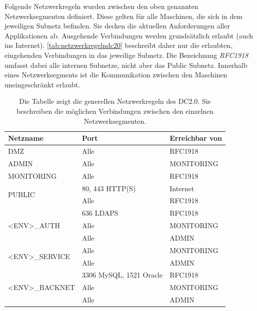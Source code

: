 Folgende Netzwerkregeln wurden zwischen den oben genannten Netzwerksegmenten definiert. Diese gelten für alle Maschinen, die sich in dem jeweiligen Subnetz befinden. Sie decken die aktuellen Anforderungen aller Applikationen ab. Ausgehende Verbindungen werden grundsätzlich erlaubt (auch ins Internet). \autoref{tab:netzwerkregelndc20} beschreibt daher nur die erlaubten, eingehenden Verbindungen in das jeweilige Subnetz. Die Bezeichnung \textit{RFC1918} umfasst dabei alle internen Subnetze, nicht aber das Public Subnetz. Innerhalb eines Netzwerksegments ist die Kommunikation zwischen den Maschinen uneingeschränkt erlaubt.

\begin{table}[ht]
\setlength{\tabcolsep}{5pt}
\renewcommand{\arraystretch}{1.5}
\centering
\begin{tabular}{|l|l|l|}
\hline
\rowcolor[HTML]{C0C0C0}
\textbf{Netzname} 				& \textbf{Port} 		& \textbf{Erreichbar von}	\\ 
\hline
DMZ 								& Alle				& RFC1918		\\ 
\hline 
ADMIN 							& Alle 				& MONITORING		\\ 
\hline 
MONITORING						& Alle 				& RFC1918		\\ 
\hline 
\multirow{2}{*}{PUBLIC} 			& 80, 443 HTTP(S)	& Internet		\\ 
\cline{2-3}
								& Alle				& RFC1918		\\
\hline 
\multirow{3}{*}{<ENV>\_AUTH}		& 636 LDAPS			& RFC1918		\\
\cline{2-3} 
								& Alle 				& MONITORING		\\
\cline{2-3} 								
								& Alle				& ADMIN			\\
\hline
\multirow{2}{*}{<ENV>\_SERVICE}	& Alle				& MONITORING		\\ 
\cline{2-3} 								
								& Alle				& ADMIN			\\
\hline 
\multirow{3}{*}{<ENV>\_BACKNET}	& 3306 MySQL, 1521 Oracle & RFC1918		\\
\cline{2-3} 		
								& Alle				& MONITORING		\\
\cline{2-3} 								
								& Alle				& ADMIN			\\
\hline
\end{tabular} 
\caption[Generelle Netzwerkregeln des DC2.0]{Die Tabelle zeigt die generellen Netzwerkregeln des DC2.0. Sie beschreiben die möglichen Verbindungen zwischen den einzelnen Netzwerksegmenten.}
\label{tab:netzwerkregelndc20}
\end{table}

